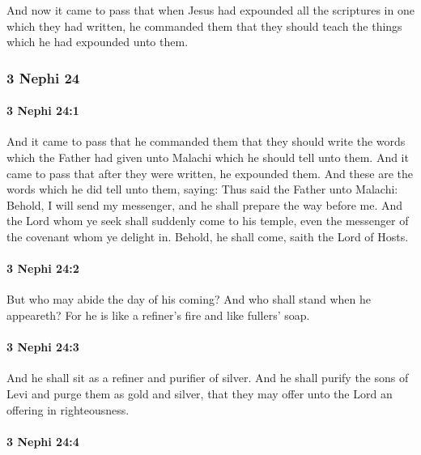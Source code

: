			And now it came to pass that
			when Jesus had expounded all the scriptures in one which they had written,
			he commanded them that they should teach the things
			which he had expounded unto them.

	\subsubsection{3 Nephi 24} %
		\label{3NEPHI-24}
		
		\paragraph{3 Nephi 24:1} %
			\label{3NEPHI-24-1}

			And it came to pass that he commanded them
			that they should write the words which the Father had given unto Malachi
			which he should tell unto them.
			And it came to pass that after they were written, he expounded them.
			And these are the words which he did tell unto them, saying:
			Thus said the Father unto Malachi:
			Behold, I will send my messenger,
			and he shall prepare the way before me.
			And the Lord whom ye seek shall suddenly come to his temple,
			even the messenger of the covenant whom ye delight in.
			Behold, he shall come, saith the Lord of Hosts.

		\paragraph{3 Nephi 24:2} %
			\label{3NEPHI-24-2}

			But who may abide the day of his coming?
			And who shall stand when he appeareth?
			For he is like a refiner's fire and like fullers' soap.

		\paragraph{3 Nephi 24:3} %
			\label{3NEPHI-24-3}

			And he shall sit as a refiner and purifier of silver.
			And he shall purify the sons of Levi and purge them as gold and silver,
			that they may offer unto the Lord an offering in righteousness.

		\paragraph{3 Nephi 24:4} %
			\label{3NEPHI-24-4}

